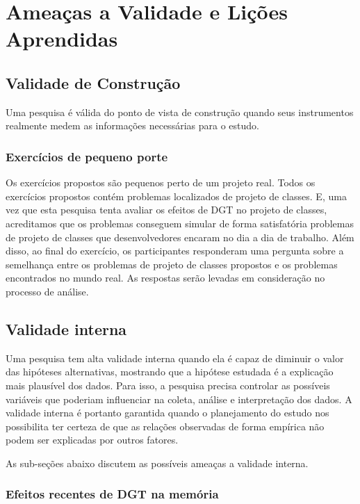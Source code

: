 \chapter{Ameaças a Validade e Lições Aprendidas}
\label{cap:ameacas}

\section{Validade de Construção}

Uma pesquisa é válida do ponto de vista de construção quando seus instrumentos realmente
medem as informações necessárias para o estudo.

\subsection{Exercícios de pequeno porte}

Os exercícios propostos são pequenos perto de um projeto real. Todos os exercícios propostos contém
problemas localizados de projeto de classes. E, uma vez que esta pesquisa tenta avaliar os efeitos de DGT no projeto de classes, 
acreditamos que os problemas conseguem simular de forma satisfatória
problemas de projeto de classes que desenvolvedores encaram no dia a dia de trabalho.
Além disso, ao final do exercício, os participantes responderam uma pergunta sobre a semelhança
entre os problemas de projeto de classes propostos e os problemas encontrados no mundo real.
As respostas serão levadas em consideração no processo de análise.

\section{Validade interna}

Uma pesquisa tem alta validade interna quando ela é capaz de diminuir o valor das hipóteses alternativas, mostrando
que a hipótese estudada é a explicação mais plausível dos dados. Para isso, a pesquisa precisa controlar as possíveis
variáveis que poderiam influenciar na coleta, análise e interpretação dos dados. A validade interna é portanto
garantida quando o planejamento do estudo nos possibilita ter certeza de que as relações observadas de
forma empírica não podem ser explicadas por outros fatores.

As sub-seções abaixo discutem as possíveis ameaças a validade interna.

\subsection{Efeitos recentes de DGT na memória}

